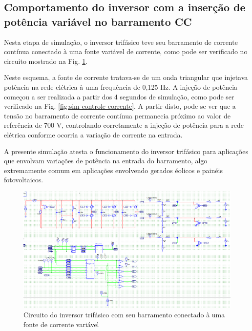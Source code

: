 \subsection{Comportamento do inversor com a inserção de potência variável no barramento CC}

Nesta etapa de simulação, o inversor trifásico teve seu barramento de corrente contínua conectado à uma fonte variável de corrente, 
como pode ser verificado no circuito mostrado na Fig. \ref{fig:sim-controle-corrente-esq}.

Neste esquema, a fonte de corrente tratava-se de um onda triangular que injetava potência na rede elétrica à uma frequência de 0,125 Hz.
A injeção de potência começou a ser realizada a partir dos 4 segundos de simulação, como pode ser verificado na Fig. \ref{fig:sim-controle-corrente}.
A partir disto, pode-se ver que a tensão no barramento de corrente contínua permanecia próximo ao valor de referência de 700 V, controlando corretamente
a injeção de potência para a rede elétrica conforme ocorria a variação de corrente na entrada.

A presente simulação atesta o funcionamento do inversor trifásico para aplicações que envolvam variações de potência na entrada do barramento, algo extremamente comum
em aplicações envolvendo gerados éolicos e painéis fotovoltaicos.

\begin{figure}[!hbt]
	\begin{center}
    \includegraphics[width=\textwidth]{figuras/sim_figures/controle_corrente/simulacao_controle_corrente1.PNG}
    \caption{Circuito do inversor trifásico com seu barramento conectado à uma fonte de corrente variável}
    \label{fig:sim-controle-corrente-esq}
    \end{center}
\end{figure}

